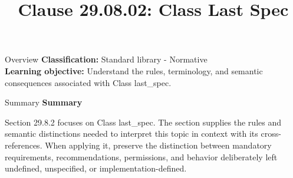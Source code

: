 \documentclass[10pt,letterpaper]{article}
\title{Clause 29.08.02: Class Last Spec}
\author{}
\date{}
\begin{document}
\maketitle
\begin{CornellOverviewBox}{Overview}
\textbf{Classification:} Standard library - Normative\\[2pt]
\textbf{Learning objective:} Understand the rules, terminology, and semantic consequences associated with Class last\_spec.
\end{CornellOverviewBox}\begin{CornellSummaryBox}{Summary}
{\sffamily\bfseries\color{Accent} Summary}\par\vspace{3pt}Section 29.8.2 focuses on Class last\_spec. The section supplies the rules and semantic distinctions needed to interpret this topic in context with its cross-references. When applying it, preserve the distinction between mandatory requirements, recommendations, permissions, and behavior deliberately left undefined, unspecified, or implementation-defined.
\end{CornellSummaryBox}
\end{document}
